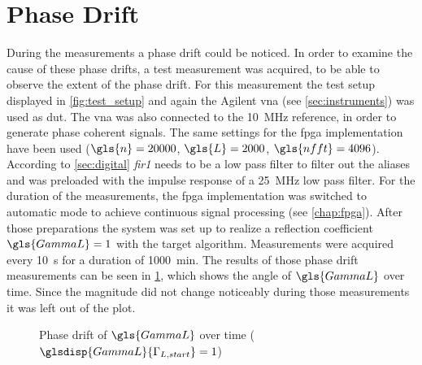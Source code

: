 \documentclass[12pt,a4paper,parskip=full,abstract=true,BCOR=12mm,twoside,open=right]{scrreprt}
\def\device#1{\mbox{\textit{#1}}}
\begin{document}

\section{Phase Drift}
\label{sec:drift}

During the measurements a phase drift could be noticed. In order to examine the
cause of these phase drifts, a test measurement was acquired, to be able
to observe the extent of the phase drift. For this measurement the test setup
displayed in \cref{fig:test_setup} and again the Agilent \gls{vna} (see \cref{sec:instruments})
was used as \gls{dut}. The \gls{vna} was also connected to the
\SI{10}{\mega\hertz} reference, in order to generate phase coherent signals. The same
settings for the \gls{fpga} implementation have been used ($\gls{n} = 20000$, $\gls{L} = 2000$, $\gls{nfft} = 4096$).
According to \cref{sec:digital} \device{fir1} needs to be a low pass filter to
filter out the aliases and was preloaded with the impulse response of a \SI{25}{\mega\hertz} low pass filter.
For the duration of the measurements, the \gls{fpga} implementation was switched to automatic mode to
achieve continuous signal processing (see \cref{chap:fpga}). After
those preparations the system was set up to realize a reflection coefficient $\gls{GammaL} = 1$ with
the target algorithm. Measurements were acquired every \SI{10}{\second} for a duration
of \SI{1000}{\minute}. The results of those phase drift measurements can be seen in
\cref{fig:phase_single}, which shows the angle of $\gls{GammaL}$ over time. Since the magnitude did not change noticeably during those measurements
it was left out of the plot.

\begin{figure}[htb]
    \centering
    \caption{Phase drift of $\gls{GammaL}$ over time ($\glsdisp{GammaL}{\Gamma_{L,start}} = 1$)}
    \label{fig:phase_single}
\end{figure}
\end{document}
